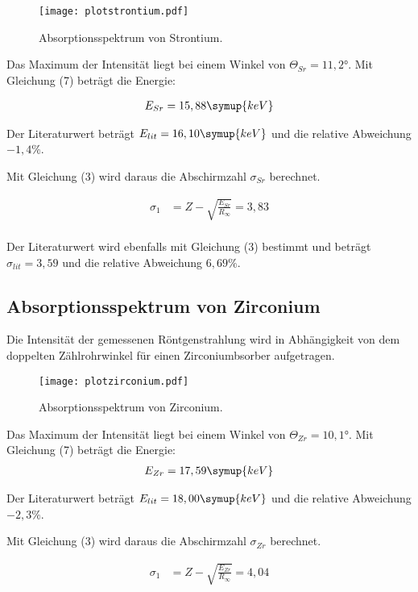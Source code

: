 \begin{figure}[H]
  \centering
  \texttt{[image: plotstrontium.pdf]}
  \caption{Absorptionsspektrum von Strontium.}
  \label{fig:plot}
\end{figure}

Das Maximum der Intensität liegt bei einem Winkel von $\Theta_{Sr} = 11,2°$.
Mit Gleichung (7) beträgt die Energie:

\begin{align*}
  E_{Sr} = 15,88 \symup{keV}
\end{align*}

Der Literaturwert beträgt $E_{lit} = 16,10 \symup{keV}$ \cite{sample2} und die relative Abweichung $-1,4\%$.


Mit Gleichung (3) wird daraus die Abschirmzahl $\sigma_{Sr}$  berechnet.

\begin{align*}
  \sigma_1 &= Z - \sqrt{\frac{E_{Sr}}{R_{\infty}}} = 3,83 \\
\end{align*}

Der Literaturwert wird ebenfalls mit Gleichung (3) bestimmt und beträgt $\sigma_{lit} = 3,59$ und die relative Abweichung $6,69\%$.


\subsection{Absorptionsspektrum von Zirconium}

Die Intensität der gemessenen Röntgenstrahlung wird in Abhängigkeit von dem doppelten Zählrohrwinkel für
einen Zirconiumbsorber aufgetragen.

\begin{figure}[H]
  \centering
  \texttt{[image: plotzirconium.pdf]}
  \caption{Absorptionsspektrum von Zirconium.}
  \label{fig:plot}
\end{figure}


Das Maximum der Intensität liegt bei einem Winkel von $\Theta_{Zr} = 10,1°$.
Mit Gleichung (7) beträgt die Energie:
\begin{align*}
  E_{Zr} = 17,59 \symup{keV}
\end{align*}

Der Literaturwert beträgt $E_{lit} = 18,00 \symup{keV}$ \cite{sample2} und die relative Abweichung $-2,3\%$.

Mit Gleichung (3) wird daraus die Abschirmzahl $\sigma_{Zr}$  berechnet.

\begin{align*}
  \sigma_1 &= Z - \sqrt{\frac{E_{Zr}}{R_{\infty}}} = 4,04 \\
\end{align*}

